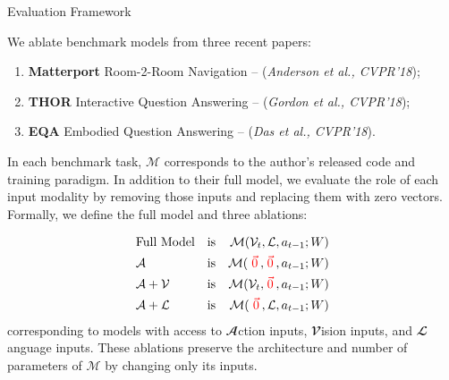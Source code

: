 \documentclass[final]{beamer}
\newcommand{\model}{$\mathcal{M}$}
\newcommand{\mmodel}{\mathcal{M}}
\newcommand{\mvisionin}{\mathcal{V}}
\newcommand{\mlanguagein}{\mathcal{L}}
\newcommand{\mhistoryin}{a}
\newcommand{\mzero}{\textcolor{red}{\vec{0}}}
\newcommand{\setblocksize}{\LARGE \centering}
\newcommand{\paragraphbreak}{\vspace{1cm}}
\begin{document}
\begin{frame}{}
\begin{columns}[t]
\begin{column}{.24\linewidth}
\begin{block}{\setblocksize Evaluation Framework}
{We ablate benchmark models from three recent papers:

\begin{enumerate}
\item \textbf{Matterport} Room-2-Room Navigation -- (\textit{Anderson et al., CVPR'18});
\item \textbf{THOR} Interactive Question Answering -- (\textit{Gordon et al., CVPR'18});
\item \textbf{EQA} Embodied Question Answering -- (\textit{Das et al., CVPR'18}).
\end{enumerate}

In each benchmark task, \model{} corresponds to the author's released code and training paradigm.
In addition to their full model, we evaluate the role of each input modality by removing those inputs and replacing them with zero vectors.
Formally, we define the full model and three ablations:

\vspace{-10pt}
\begin{align}
    &\text{Full Model} & \mathrm{is} && \mmodel(\mvisionin_t, \mlanguagein, \mhistoryin_{t-1}; W) \\
    &\mathcal{A} & \mathrm{is} && \mmodel(\hspace{3pt}\mzero\hspace{2pt},\hspace{1pt} \mzero\hspace{2pt}, \mhistoryin_{t-1}; W) \\
    &\mathcal{A+V} & \mathrm{is}& & \mmodel(\mvisionin_t,\hspace{1pt} \mzero\hspace{2pt}, \mhistoryin_{t-1}; W)\\
    &\mathcal{A+L} & \mathrm{is}& & \mmodel(\hspace{3pt}\mzero\hspace{2pt}, \mlanguagein, \mhistoryin_{t-1}; W)
\end{align}
corresponding to models with access to $\mathbfcal{A}$ction inputs, $\mathbfcal{V}$ision inputs, and $\mathbfcal{L}$anguage inputs.
These ablations preserve the architecture and number of parameters of \model{} by changing only its inputs.
\paragraphbreak

}
\end{block}
\end{column}
\end{columns}
\end{frame}
\end{document}
